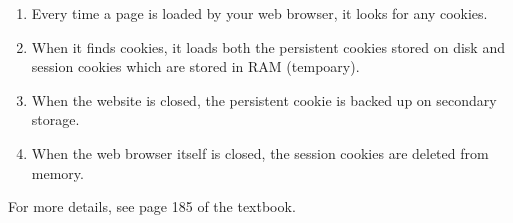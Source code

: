 \documentclass[../main.tex]{subfiles}
\begin{document}
\begin{enumerate}
    \item Every time a page is loaded by your web browser, it looks for any cookies.
    \item When it finds cookies, it loads both the persistent cookies stored on disk and session cookies which are stored in RAM (tempoary).
    \item When the website is closed, the persistent cookie is backed up on secondary storage.
    \item When the web browser itself is closed, the session cookies are deleted from memory.
\end{enumerate}

For more details, see page 185 of the textbook.
\end{document}
